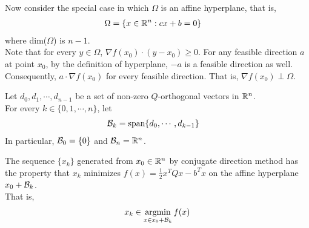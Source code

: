 \documentclass{article}
\begin{document}
	\begin{corollary}
		Now consider the special case in which $\Omega$ is an affine hyperplane, that is,
		\begin{align}
			\Omega &= \{x \in \mathbb{R}^n: cx + b = 0\}
		\end{align}
		where dim($\Omega$) is $n-1$. \\
		Note that for every $y \in \Omega$, $\nabla f(x_0) \cdot (y - x_0) \geq 0$. For any feasible direction $a$ at point $x_0$, by the definition of hyperplane, $-a$ is a feasible direction as well. \\
		Consequently, $a \cdot \nabla f(x_0)$ for every feasible direction. That is, $\nabla f(x_0) \perp \Omega$.
	\end{corollary}
	
	\begin{notation}
		Let $d_0, d_1, \cdots, d_{n-1}$ be a set of non-zero $Q$-orthogonal vectors in $\mathbb{R}^n$.\\
		For every $k \in \{0, 1, \cdots, n\}$, let
		\begin{align}
			\mathcal{{B}}_k &= \text{{span}} \{d_0, \cdots, d_{k-1}\}
		\end{align}
		In particular, $\mathcal{{B}}_0 = \{0\}$ and $\mathcal{{B}}_{n} = \mathbb{R}^n$.
	\end{notation}
	
	\begin{theorem}
		The sequence $\{x_k\}$ generated from $x_0 \in \mathbb{R}^n$ by conjugate direction method has the property that $x_k$ minimizes $f(x) = \frac{1}{2}x^T Q x - b^Tx$ on the affine hyperplane $x_0 + \mathcal{{B}}_k$. \\
		That is, 
		\begin{align}
			x_k \in \operatorname*{argmin}_{x \in x_0 + \mathcal{{B}}_k} f(x)
		\end{align}
	\end{theorem}
	
\end{document}
